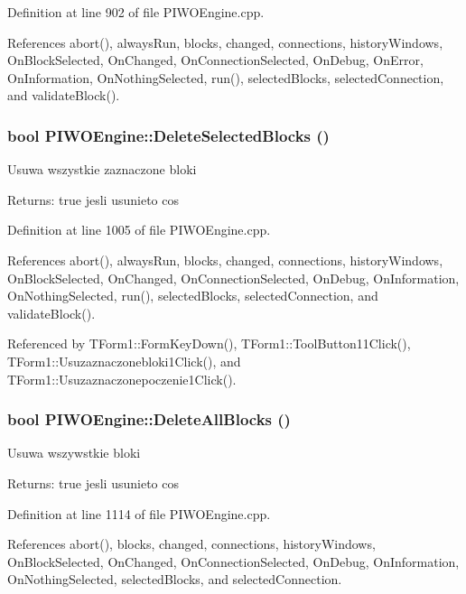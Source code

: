 Definition at line 902 of file PIWOEngine.cpp.

References abort(), alwaysRun, blocks, changed, connections, historyWindows, OnBlockSelected, OnChanged, OnConnectionSelected, OnDebug, OnError, OnInformation, OnNothingSelected, run(), selectedBlocks, selectedConnection, and validateBlock().\hypertarget{classPIWOEngine_a11ad8ce77d2e5b026ebc3469bdff0d9}{
\subsubsection[DeleteSelectedBlocks]{\setlength{\rightskip}{0pt plus 5cm}bool PIWOEngine::DeleteSelectedBlocks ()}}
\label{classPIWOEngine_a11ad8ce77d2e5b026ebc3469bdff0d9}


Usuwa wszystkie zaznaczone bloki \begin{Desc}
\item[Returns:]true jesli usunieto cos \end{Desc}


Definition at line 1005 of file PIWOEngine.cpp.

References abort(), alwaysRun, blocks, changed, connections, historyWindows, OnBlockSelected, OnChanged, OnConnectionSelected, OnDebug, OnInformation, OnNothingSelected, run(), selectedBlocks, selectedConnection, and validateBlock().

Referenced by TForm1::FormKeyDown(), TForm1::ToolButton11Click(), TForm1::Usuzaznaczonebloki1Click(), and TForm1::Usuzaznaczonepoczenie1Click().\hypertarget{classPIWOEngine_edd85509770c459cd621bfeb5eba4ac7}{
\subsubsection[DeleteAllBlocks]{\setlength{\rightskip}{0pt plus 5cm}bool PIWOEngine::DeleteAllBlocks ()}}
\label{classPIWOEngine_edd85509770c459cd621bfeb5eba4ac7}


Usuwa wszywstkie bloki \begin{Desc}
\item[Returns:]true jesli usunieto cos \end{Desc}


Definition at line 1114 of file PIWOEngine.cpp.

References abort(), blocks, changed, connections, historyWindows, OnBlockSelected, OnChanged, OnConnectionSelected, OnDebug, OnInformation, OnNothingSelected, selectedBlocks, and selectedConnection.

